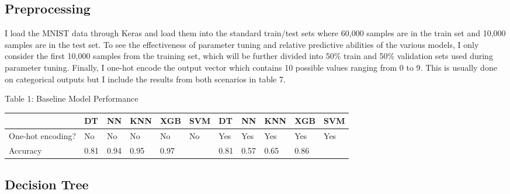 \documentclass{article}
\begin{document}
\subsection{Preprocessing}
I load the MNIST data through Keras and load them into the standard train/test sets where 60,000 samples are in the train set and 10,000 samples are in the test set. To see the effectiveness of parameter tuning and relative predictive abilities of the various models, I only consider the first 10,000 samples from the training set, which will be further divided into 50\% train and 50\% validation sets used during parameter tuning. Finally, I one-hot encode the output vector which contains 10 possible values ranging from 0 to 9. This is usually done on categorical outputs but I include the results from both scenarios in table 7. 

\begin{table}
	\centering
	Table 1: Baseline Model Performance
	\begin{tabular}{ l l l l l l | l l l l l }
		\hline
		&DT  & NN & KNN& XGB & SVM & DT & NN & KNN & XGB & SVM \\
		\hline
		One-hot encoding?&No  &No  &No  & No &No &Yes &Yes &Yes &Yes &Yes \\
		Accuracy      &0.81&0.94&0.95&0.97&   &0.81&0.57&0.65&0.86&  \\
		\hline 
		
		
	\end{tabular}
\end{table}

 
\subsection{Decision Tree}
\end{document}
